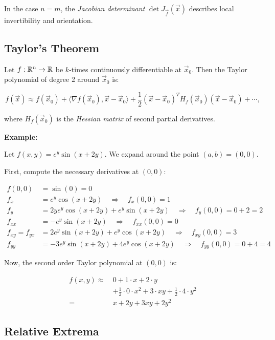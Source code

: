 In the case \( n = m \), the \emph{Jacobian determinant} \( \det J_{\vec{f}}(\vec{x}) \) 
describes local invertibility and orientation.

\subsection{Taylor's Theorem}

Let \( f : \mathbb{R}^n \to \mathbb{R} \) be \(k\)-times continuously differentiable at \( \vec{x}_0 \). Then 
the Taylor polynomial of degree 2 around \( \vec{x}_0 \) is:

\[
    f(\vec{x}) \approx f(\vec{x}_0) + \langle \nabla f(\vec{x}_0), \vec{x} - \vec{x}_0 \rangle + 
    \frac{1}{2} {(\vec{x} - \vec{x}_0)}^T H_f(\vec{x}_0)(\vec{x} - \vec{x}_0) + \cdots,
\]

where \( H_f(\vec{x}_0) \) is the \emph{Hessian matrix} of second partial derivatives.

\textbf{Example:} 

Let \( f(x, y) = e^y \sin(x + 2y) \). We expand around the point \( (a, b) = (0, 0) \).

First, compute the necessary derivatives at \( (0, 0) \):

\begin{align*}
    f(0, 0) &= \sin(0) = 0 \\
    f_x &= e^y \cos(x + 2y) \quad \Rightarrow \quad f_x(0, 0) = 1 \\
    f_y &= 2y e^y \cos(x + 2y) + e^y \sin(x + 2y) \quad \Rightarrow \quad f_y(0, 0) = 0 + 2 = 2 \\
    f_{xx} &= -e^y \sin(x + 2y) \quad \Rightarrow \quad f_{xx}(0, 0) = 0 \\
    f_{xy} = f_{yx} &= 2e^y \sin(x + 2y) + e^y \cos(x +2y) \quad \Rightarrow \quad f_{xy}(0, 0) = 3 \\
    f_{yy} &= -3 e^y \sin(x + 2y) + 4e^y \cos(x + 2y) \quad \Rightarrow \quad f_{yy}(0, 0) = 0 + 4 = 4
\end{align*}

Now, the second order Taylor polynomial at \( (0, 0) \) is:

\begin{align*}
    f(x, y) \approx\ & 0 + 1 \cdot x + 2 \cdot y \\
    &+ \frac{1}{2} \cdot 0 \cdot x^2 + 3 \cdot x y + \frac{1}{2} \cdot 4 \cdot y^2 \\
    =\, & x + 2y + 3xy + 2y^2
\end{align*}

\subsection{Relative Extrema}

